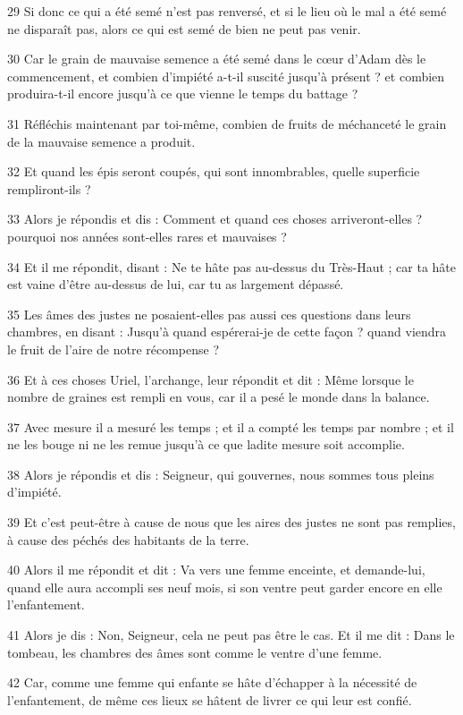 \par 29 Si donc ce qui a été semé n'est pas renversé, et si le lieu où le mal a été semé ne disparaît pas, alors ce qui est semé de bien ne peut pas venir.
\par 30 Car le grain de mauvaise semence a été semé dans le cœur d'Adam dès le commencement, et combien d'impiété a-t-il suscité jusqu'à présent ? et combien produira-t-il encore jusqu'à ce que vienne le temps du battage ?
\par 31 Réfléchis maintenant par toi-même, combien de fruits de méchanceté le grain de la mauvaise semence a produit.
\par 32 Et quand les épis seront coupés, qui sont innombrables, quelle superficie rempliront-ils ?
\par 33 Alors je répondis et dis : Comment et quand ces choses arriveront-elles ? pourquoi nos années sont-elles rares et mauvaises ?
\par 34 Et il me répondit, disant : Ne te hâte pas au-dessus du Très-Haut ; car ta hâte est vaine d'être au-dessus de lui, car tu as largement dépassé.
\par 35 Les âmes des justes ne posaient-elles pas aussi ces questions dans leurs chambres, en disant : Jusqu'à quand espérerai-je de cette façon ? quand viendra le fruit de l’aire de notre récompense ?
\par 36 Et à ces choses Uriel, l'archange, leur répondit et dit : Même lorsque le nombre de graines est rempli en vous, car il a pesé le monde dans la balance.
\par 37 Avec mesure il a mesuré les temps ; et il a compté les temps par nombre ; et il ne les bouge ni ne les remue jusqu'à ce que ladite mesure soit accomplie.
\par 38 Alors je répondis et dis : Seigneur, qui gouvernes, nous sommes tous pleins d'impiété.
\par 39 Et c'est peut-être à cause de nous que les aires des justes ne sont pas remplies, à cause des péchés des habitants de la terre.
\par 40 Alors il me répondit et dit : Va vers une femme enceinte, et demande-lui, quand elle aura accompli ses neuf mois, si son ventre peut garder encore en elle l'enfantement.
\par 41 Alors je dis : Non, Seigneur, cela ne peut pas être le cas. Et il me dit : Dans le tombeau, les chambres des âmes sont comme le ventre d'une femme.
\par 42 Car, comme une femme qui enfante se hâte d'échapper à la nécessité de l'enfantement, de même ces lieux se hâtent de livrer ce qui leur est confié.
